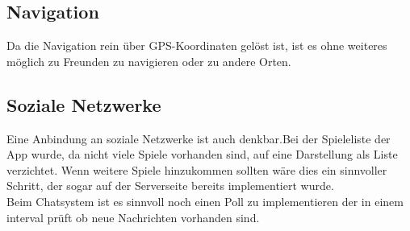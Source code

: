 \subsection{Navigation}
Da die Navigation rein über GPS-Koordinaten gelöst ist, ist es ohne weiteres möglich zu Freunden zu navigieren oder zu andere Orten.

\subsection{Soziale Netzwerke}
Eine Anbindung an soziale Netzwerke ist auch denkbar.Bei der Spieleliste der App wurde, da nicht viele Spiele vorhanden sind, auf eine Darstellung als Liste verzichtet. Wenn weitere Spiele hinzukommen sollten wäre dies ein sinnvoller Schritt, der sogar auf der Serverseite bereits implementiert wurde.\\
Beim Chatsystem ist es sinnvoll noch einen Poll zu implementieren der in einem interval prüft ob neue Nachrichten vorhanden sind.
